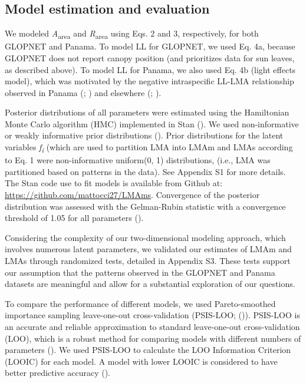 \documentclass[
  12pt,
  letterpaper,
  DIV=11,
  numbers=noendperiod]{scrartcl}
\begin{document}
\subsection{Model estimation and
evaluation}\label{model-estimation-and-evaluation}

We modeled \emph{A}\textsubscript{area} and \emph{R}\textsubscript{area}
using Eqs. 2 and 3, respectively, for both GLOPNET and Panama. To model
LL for GLOPNET, we used Eq. 4a, because GLOPNET does not report canopy
position (and prioritizes data for sun leaves, as described above). To
model LL for Panama, we also used Eq. 4b (light effects model), which
was motivated by the negative intraspecific LL-LMA relationship observed
in Panama (;
) and elsewhere
(;
).

Posterior distributions of all parameters were estimated using the
Hamiltonian Monte Carlo algorithm (HMC) implemented in Stan
(). We used
non-informative or weakly informative prior distributions
(). Prior distributions for the
latent variables \emph{f\textsubscript{i}} (which are used to partition
LMA into LMAm and LMAs according to Eq. 1 were non-informative
uniform(0, 1) distributions, (i.e., LMA was partitioned based on
patterns in the data). See Appendix S1 for more details. The Stan code
use to fit models is available from Github at:
\url{https://github.com/mattocci27/LMAms}. Convergence of the posterior
distribution was assessed with the Gelman-Rubin statistic with a
convergence threshold of 1.05 for all parameters
().

Considering the complexity of our two-dimensional modeling approach,
which involves numerous latent parameters, we validated our estimates of
LMAm and LMAs through randomized tests, detailed in Appendix S3. These
tests support our assumption that the patterns observed in the GLOPNET
and Panama datasets are meaningful and allow for a substantial
exploration of our questions.

To compare the performance of different models, we used Pareto-smoothed
importance sampling leave-one-out cross-validation (PSIS-LOO;
()). PSIS-LOO is an
accurate and reliable approximation to standard leave-one-out
cross-validation (LOO), which is a robust method for comparing models
with different numbers of parameters (). We used PSIS-LOO to calculate the LOO Information
Criterion (LOOIC) for each model. A model with lower LOOIC is considered
to have better predictive accuracy ().
\end{document}
